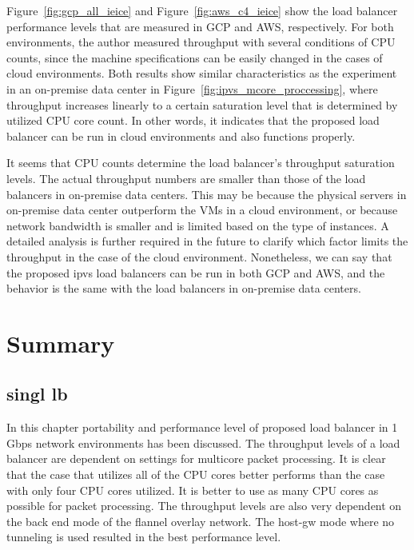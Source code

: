 Figure~\ref{fig:gcp_all_ieice} and Figure~\ref{fig:aws_c4_ieice} show the load balancer performance levels that are measured in GCP and AWS, respectively.
For both environments, the author measured throughput with several conditions of CPU counts, since the machine specifications can be easily changed in the cases of cloud environments.
Both results show similar characteristics as the experiment in an on-premise data center in Figure~\ref{fig:ipvs_mcore_proccessing}, where throughput increases linearly to a certain saturation level that is determined by utilized CPU core count.
In other words, it indicates that the proposed load balancer can be run in cloud environments and also functions properly.

It seems that CPU counts determine the load balancer's throughput saturation levels.
The actual throughput numbers are smaller than those of the load balancers in on-premise data centers.
This may be because the physical servers in on-premise data center outperform the VMs in a cloud environment, or because network bandwidth is smaller and is limited based on the type of instances.
A detailed analysis is further required in the future to clarify which factor limits the throughput in the case of the cloud environment.
Nonetheless, we can say that the proposed ipvs load balancers can be run in both GCP and AWS, and the behavior is the same with the load balancers in on-premise data centers.


\FloatBarrier

\section{Summary}

\subsection{singl lb}

In this chapter portability and performance level of proposed load balancer in 1 Gbps network environments has been discussed.
The throughput levels of a load balancer are dependent on settings for multicore packet processing.
It is clear that the case that utilizes all of the CPU cores better performs than the case with only four CPU cores utilized.
It is better to use as many CPU cores as possible for packet processing.
The throughput levels are also very dependent on the back end mode of the flannel overlay network.
The host-gw mode where no tunneling is used resulted in the best performance level.

